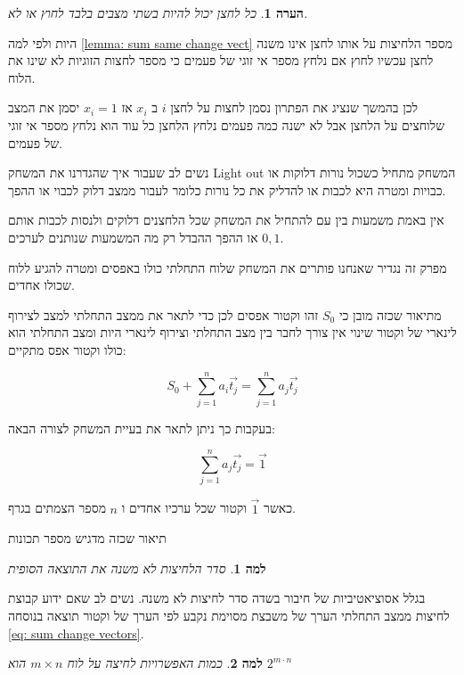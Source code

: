 \documentclass[12pt,leqno]{article}
\newtheorem{lemma}{למה}[section]
\newtheorem{comm}{הערה}[section]
\newcommand{\sumi}[1]{\sum_{#1=1}^n}
\begin{document}
\begin{comm}
    \label{comm: press is uneven presses}
    כל לחצן יכול להיות בשתי מצבים בלבד
    לחוץ או לא.
\end{comm}

היות ולפי למה
\ref{lemma:  sum same change vect}
מספר הלחיצות על אותו לחצן אינו משנה 
לחצן עכשיו 
לחוץ אם נלחץ מספר אי זוגי של פעמים 
כי מספר לחצות הזוגיות לא שינו את הלוח.

לכן בהמשך שנציג את הפתרון נסמן לחצות על לחצן 
$i$
ב
$x_i$
אז 
$x_i = 1$
יסמן את המצב שלוחצים על הלחצן אבל לא ישנה כמה פעמים נלחץ הלחצן 
כל עוד הוא נלחץ מספר אי זוגי של פעמים.

נשים לב שעבור איך שהגדרנו את המשחק 
{Light out}
המשחק מתחיל כשכול
נורות דלוקות או כבויות
ומטרה היא לכבות או להדליק את כל נורות
כלומר לעבור ממצב דלוק לכבוי או ההפך.

אין באמת משמעות בין עם להתחיל את המשחק שכל הלחצנים דלוקים ולנסות לכבות אותם או ההפך ההבדל רק
מה המשמעות שנותנים לערכים
$0 ,1 $.

מפרק זה נגדיר שאנחנו פותרים את המשחק שלוח התחלתי כולו באפסים
ומטרה להגיע ללוח שכולו אחדים.

מתיאור שכזה מובן כי 
$S_0$
זהו וקטור אפסים לכן כדי לתאר את ממצב התחלתי
למצב לצירוף לינארי של וקטור שינוי 
אין צורך לחבר בין מצב התחלתי וצירוף לינארי
היות ומצב התחלתי הוא כולו וקטור אפס
מתקיים:

\begin{equation}
    \label{eq: sum change vectors}
    S_0 + \sumi{j} a_i \vec{t_j} =  \sumi{j} a_j \vec{t_j}
\end{equation}

בעקבות כך ניתן לתאר את בעיית המשחק לצורה הבאה:

\begin{equation}
    \label{eq: lin eq for solving problem}
    \sumi{j} a_j \vec{t_j} = \vec{1}
\end{equation}

כאשר
$\vec{1}$
וקטור שכל ערכיו אחדים
ו
$n$
מספר הצמתים בגרף.

תיאור שכזה מדגיש מספר תכונות 

\begin{lemma}
    \label{lemma: order presses}
    סדר הלחיצות לא משנה את התוצאה הסופית
\end{lemma}

בגלל אסוציאטיביות של חיבור בשדה 
סדר לחיצות לא משנה.
נשים לב שאם ידוע קבוצת לחיצות ממצב התחלתי הערך של משבצת מסוימת נקבע לפי 
הערך של וקטור תוצאה
בנוסחה
\ref{eq: sum change vectors}.


\begin{lemma}
    \label{lemma: num presses}
    כמות האפשרויות לחיצה על לוח
    $m \times n$
    הוא 
    $2^{m \cdot n}$
\end{lemma}
\end{document}
